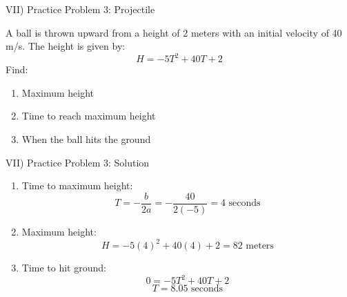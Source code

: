 \documentclass[aspectratio=169]{beamer}
\begin{document}
\begin{frame}{VII) Practice Problem 3: Projectile}
    \begin{tcolorbox}[colback=lightgray,colframe=primary,title=Problem]
        \footnotesize
        A ball is thrown upward from a height of 2 meters with an initial velocity of 40 m/s. The height is given by:
        \[H = -5T^2 + 40T + 2\]
        Find:
        \begin{enumerate}
            \item Maximum height
            \item Time to reach maximum height
            \item When the ball hits the ground
        \end{enumerate}
    \end{tcolorbox}
\end{frame}

\begin{frame}{VII) Practice Problem 3: Solution}
    \begin{tcolorbox}[colback=lightgray,colframe=accent,title=Solution]
        \footnotesize
        \begin{enumerate}
            \item Time to maximum height:
            \[T = -\frac{b}{2a} = -\frac{40}{2(-5)} = 4 \text{ seconds}\]
            \item Maximum height:
            \[H = -5(4)^2 + 40(4) + 2 = 82 \text{ meters}\]
            \item Time to hit ground:
            \[0 = -5T^2 + 40T + 2\]
            \[T = 8.05 \text{ seconds}\]
        \end{enumerate}
    \end{tcolorbox}
\end{frame}
\end{document}
